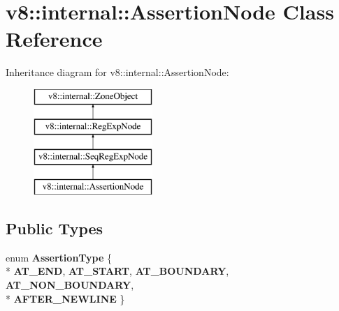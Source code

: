 \hypertarget{classv8_1_1internal_1_1_assertion_node}{}\section{v8\+:\+:internal\+:\+:Assertion\+Node Class Reference}
\label{classv8_1_1internal_1_1_assertion_node}
Inheritance diagram for v8\+:\+:internal\+:\+:Assertion\+Node\+:\begin{figure}[H]
\begin{center}
\leavevmode
\includegraphics[height=4.000000cm]{classv8_1_1internal_1_1_assertion_node}
\end{center}
\end{figure}
\subsection*{Public Types}
\begin{DoxyCompactItemize}
\item 
\hypertarget{classv8_1_1internal_1_1_assertion_node_aa677ff26097f7ecb13c9283478981035}{}enum {\bfseries Assertion\+Type} \{ \\*
{\bfseries A\+T\+\_\+\+E\+N\+D}, 
{\bfseries A\+T\+\_\+\+S\+T\+A\+R\+T}, 
{\bfseries A\+T\+\_\+\+B\+O\+U\+N\+D\+A\+R\+Y}, 
{\bfseries A\+T\+\_\+\+N\+O\+N\+\_\+\+B\+O\+U\+N\+D\+A\+R\+Y}, 
\\*
{\bfseries A\+F\+T\+E\+R\+\_\+\+N\+E\+W\+L\+I\+N\+E}
 \}\label{classv8_1_1internal_1_1_assertion_node_aa677ff26097f7ecb13c9283478981035}

\end{DoxyCompactItemize}
